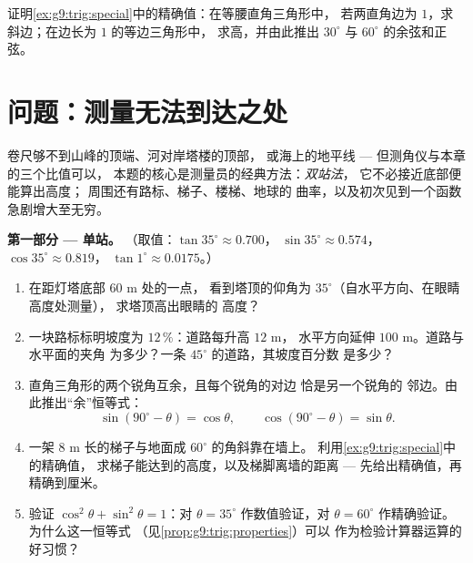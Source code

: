 \begin{exercise}[$\star\star\star$]\label{exo:g9:trig:9}
证明\cref{ex:g9:trig:special}中的精确值：在等腰直角三角形中，
若两直角边为 $1$，求斜边；在边长为 $1$ 的等边三角形中，
求高，并由此推出
$30^\circ$ 与 $60^\circ$ 的余弦和正弦。
\end{exercise}

\section{问题：测量无法到达之处}

\begin{problem}
\label{pb:g9:trig:1}
卷尺够不到山峰的顶端、河对岸塔楼的顶部，
或海上的地平线 --- 但测角仪与本章的三个比值可以，
本题的核心是测量员的经典方法：\emph{双站法}，
它不必接近底部便能算出高度；
周围还有路标、梯子、楼梯、地球的
曲率，以及初次见到一个函数
急剧增大至无穷。

\medskip
\noindent\textbf{第一部分 --- 单站。}
（取值：$\tan 35^\circ \approx 0.700$，
$\sin 35^\circ \approx 0.574$，$\cos 35^\circ \approx 0.819$，
$\tan 1^\circ \approx 0.0175$。）
\begin{enumerate}
  \item 在距灯塔底部 $60$ m 处的一点，
        看到塔顶的仰角为 $35^\circ$（自水平方向、在眼睛高度处测量），
        求塔顶高出眼睛的
        高度？
  \item 一块路标标明坡度为 $12\,\%$：道路每升高 $12$ m，
        水平方向延伸 $100$ m。道路与水平面的夹角
        为多少？一条 $45^\circ$ 的道路，其坡度百分数
        是多少？
  \item 直角三角形的两个锐角互余，且每个锐角的对边
        恰是另一个锐角的
        邻边。由此推出“余”恒等式：
        \[
        \sin(90^\circ - \theta) = \cos\theta,
        \qquad
        \cos(90^\circ - \theta) = \sin\theta .
        \]
  \item 一架 $8$ m 长的梯子与地面成 $60^\circ$ 的角斜靠在墙上。
        利用\cref{ex:g9:trig:special}中的精确值，
        求梯子能达到的高度，以及梯脚离墙的距离 ---
        先给出精确值，再精确到厘米。
  \item 验证 $\cos^2\theta + \sin^2\theta = 1$：对 $\theta = 35^\circ$
        作数值验证，对 $\theta = 60^\circ$ 作精确验证。
        为什么这一恒等式
        （见\cref{prop:g9:trig:properties}）可以
        作为检验计算器运算的好习惯？
\end{enumerate}


\end{problem}
